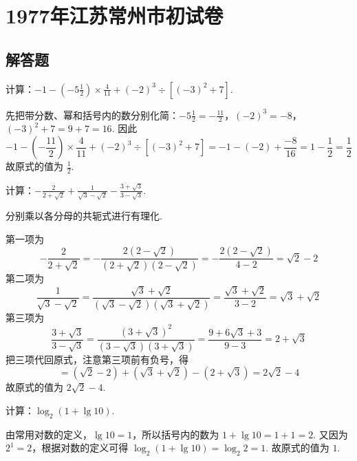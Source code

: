 \chapter{1977年江苏常州市初试卷}

\section{解答题}

\begin{problem}
计算：\(-1-\left(-5\frac{1}{2}\right)\times\frac{4}{11}+\left(-2\right)^3\div\left[\left(-3\right)^2+7\right]\).
\end{problem}

\begin{solution}
先把带分数、幂和括号内的数分别化简：\(-5\frac{1}{2}=-\frac{11}{2}\)，\((-2)^3=-8\)，\((-3)^2+7=9+7=16\). 因此
\[
-1-\left(-\frac{11}{2}\right)\times\frac{4}{11}+\left(-2\right)^3\div\left[\left(-3\right)^2+7\right]
=-1-(-2)+\frac{-8}{16}=1-\frac{1}{2}=\frac{1}{2}
\]
故原式的值为 \(\frac{1}{2}\).
\end{solution}

\begin{problem}
计算：\(-\frac{2}{2+\sqrt{2}}+\frac{1}{\sqrt{3}-\sqrt{2}}-\frac{3+\sqrt{3}}{3-\sqrt{3}}\).
\end{problem}

\begin{solution}
分别乘以各分母的共轭式进行有理化.

第一项为
\[
-\frac{2}{2+\sqrt{2}}=-\frac{2(2-\sqrt{2})}{(2+\sqrt{2})(2-\sqrt{2})}=-\frac{2(2-\sqrt{2})}{4-2}=\sqrt{2}-2
\]
第二项为
\[
\frac{1}{\sqrt{3}-\sqrt{2}}=\frac{\sqrt{3}+\sqrt{2}}{(\sqrt{3}-\sqrt{2})(\sqrt{3}+\sqrt{2})}=\frac{\sqrt{3}+\sqrt{2}}{3-2}=\sqrt{3}+\sqrt{2}
\]
第三项为
\[
\frac{3+\sqrt{3}}{3-\sqrt{3}}=\frac{(3+\sqrt{3})^2}{(3-\sqrt{3})(3+\sqrt{3})}=\frac{9+6\sqrt{3}+3}{9-3}=2+\sqrt{3}
\]
把三项代回原式，注意第三项前有负号，得
\[
=\left(\sqrt{2}-2\right)+\left(\sqrt{3}+\sqrt{2}\right)-\left(2+\sqrt{3}\right)=2\sqrt{2}-4
\]
故原式的值为 \(2\sqrt{2}-4\).
\end{solution}

\begin{problem}
计算：\(\log_2\left(1+\lg 10\right)\).
\end{problem}

\begin{solution}
由常用对数的定义，\(\lg 10=1\)，所以括号内的数为 \(1+\lg 10=1+1=2\). 又因为 \(2^1=2\)，根据对数的定义可得
\(\log_2\left(1+\lg 10\right)=\log_2 2=1\).
故原式的值为 \(1\).
\end{solution}

